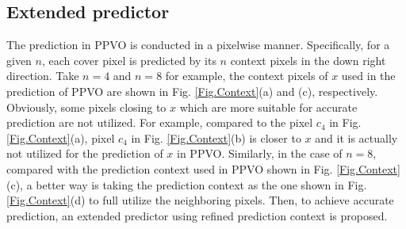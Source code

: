 \documentclass[review,3p,10pt,sort&compress]{elsarticle}
\begin{document}
\subsection{Extended predictor}\label{sec:3.1}
The prediction in PPVO is conducted in a pixelwise manner. Specifically, for a given $n$, each cover pixel is predicted by its $n$ context pixels in the down right direction. Take $n=4$ and $n=8$ for example, the context pixels of $x$ used in the prediction of PPVO are shown in Fig. \ref{Fig.Context}(a) and (c), respectively. Obviously, some pixels closing to $x$ which are more suitable for accurate prediction are not utilized. For example, compared to the pixel $c_4$ in Fig. \ref{Fig.Context}(a), pixel $c_4$ in Fig. \ref{Fig.Context}(b) is closer to $x$ and it is actually not utilized for the prediction of $x$ in PPVO.
Similarly, in the case of $n=8$, compared with the prediction context used in PPVO shown in Fig. \ref{Fig.Context}(c), a better way is taking the prediction context as the one shown in Fig. \ref{Fig.Context}(d) to full utilize the neighboring pixels. Then, to achieve accurate prediction, an extended predictor using refined prediction context is proposed.
\end{document}
